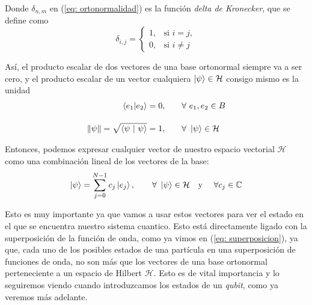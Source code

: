 \documentclass{article}
\numberwithin{equation}{section} %
\begin{document}
    \vspace{1.5mm}

    Donde \( \delta_{n, m} \) en (\ref{eq: ortonormalidad}) es la función \textit{delta de Kronecker}, que se define como
    \begin{equation}
        \delta_{i, j} = 
        \begin{cases}
            1, & \text{si } i = j, \\
            0, & \text{si } i \neq j
        \end{cases}
        \label{eq: delta_kronecker}
    \end{equation}

    \vspace{1.5mm}

    Así, el producto escalar de dos vectores de una base ortonormal siempre va a ser cero, y el producto escalar de un vector cualquiera \( \ket{\psi} \in \mathcal{H} \) consigo mismo es la unidad
    \begin{align}
        \braket{e_{1} | e_{2}} = 0, &\qquad \forall \ e_{1}, e_{2} \in B \\[10pt]
        \| \psi \| = \sqrt{\braket{\psi \ | \ \psi}} = 1, &\qquad \forall \ \ket{\psi} \in \mathcal{H}
    \end{align}

    \vspace{1.5mm}

    Entonces, podemos expresar cualquier vector de nuestro espacio vectorial \( \mathcal{H} \) como una combinación lineal de los vectores de la base:
    \begin{equation}
        \ket{\psi} = \sum_{j = 0}^{N - 1} c_{j} \ket{e_{j}}, \qquad \forall \ \ket{\psi} \in \mathcal{H} \quad \text{y} \quad \ \forall c_{j} \in \mathbb{C}
        \label{eq: combinacion_lineal_Hilbert}
    \end{equation}

    \vspace{1.5mm}

    Esto es muy importante ya que vamos a usar estos vectores para ver el estado en el que se encuentra nuestro sistema cuantico. Esto está directamente ligado con la superposición de la función de onda, como ya vimos en (\ref{eq: superposicion}), ya que, cada uno de los posibles estados de una partícula en una superposición de funciones de onda, no son más que los vectores de una base ortonormal perteneciente a un espacio de Hilbert \( \mathcal{H} \). Esto es de vital importancia y lo seguiremos viendo cuando introduzcamos los estados de un \textit{qubit}, como ya veremos más adelante.
\end{document}
